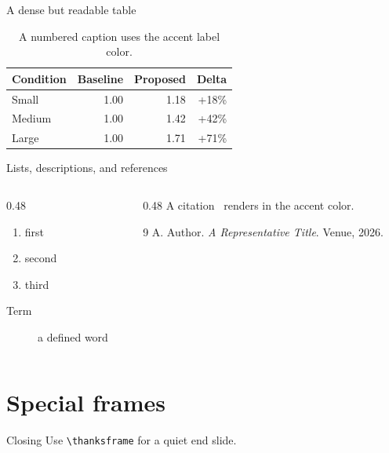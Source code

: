 \documentclass[aspectratio=169]{beamer}
\begin{document}
\begin{frame}{A dense but readable table}
  \begin{table}
    \centering
    \begin{tabular}{lrrr}
      \toprule
      Condition & Baseline & Proposed & Delta \\
      \midrule
      Small  & 1.00 & 1.18 & +18\% \\
      Medium & 1.00 & 1.42 & +42\% \\
      Large  & 1.00 & 1.71 & +71\% \\
      \bottomrule
    \end{tabular}
    \caption{A numbered caption uses the accent label color.}
  \end{table}
\end{frame}

\begin{frame}{Lists, descriptions, and references}
  \begin{columns}[T,totalwidth=\textwidth]
    \begin{column}{0.48\textwidth}
      \begin{enumerate}\item first \item second \item third\end{enumerate}
      \begin{description}\item[Term] a defined word\end{description}
    \end{column}
    \begin{column}{0.48\textwidth}
      A citation~\cite{demo} renders in the accent color.
      \begin{thebibliography}{9}
         A. Author. \emph{A Representative Title}. Venue, 2026.
      \end{thebibliography}
    \end{column}
  \end{columns}
\end{frame}

\section{Special frames}


\begin{frame}{Closing}
  Use \texttt{\textbackslash thanksframe} for a quiet end slide.
\end{frame}

\end{document}
